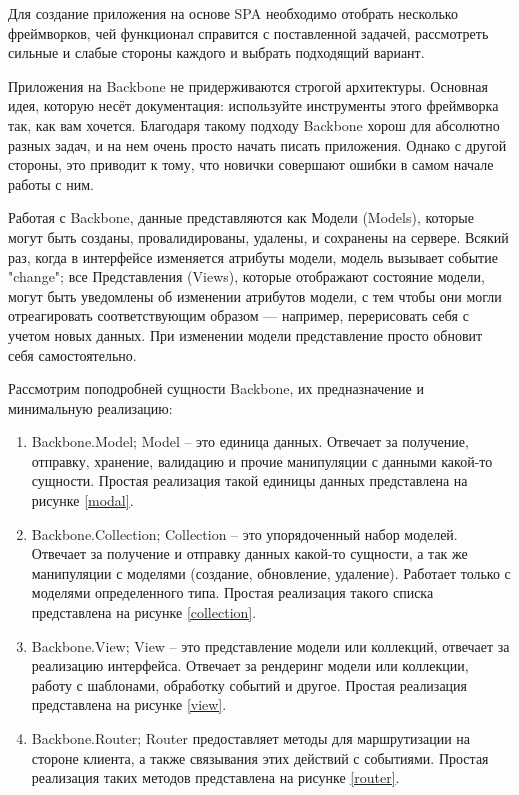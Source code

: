 Для создание приложения на основе SPA необходимо отобрать несколько фреймворков, чей функционал справится с поставленной задачей, рассмотреть сильные и слабые стороны каждого и выбрать подходящий вариант.



Приложения на Backbone не придерживаются строгой архитектуры. Основная идея, которую несёт документация: используйте инструменты этого фреймворка так, как вам хочется. Благодаря такому подходу Backbone хорош для абсолютно разных задач, и на нем очень просто начать писать приложения. Однако с другой стороны, это приводит к тому, что новички совершают ошибки в самом начале работы с ним. 

Работая с Backbone, данные представляются как Модели (Models), которые могут быть созданы, провалидированы, удалены, и сохранены на сервере. Всякий раз, когда в интерфейсе изменяется атрибуты модели, модель вызывает событие "change"; все Представления (Views), которые отображают состояние модели, могут быть уведомлены об изменении атрибутов модели, с тем чтобы они могли отреагировать соответствующим образом — например, перерисовать себя с учетом новых данных. При изменении модели представление просто обновит себя самостоятельно.

Рассмотрим поподробней сущности Backbone, их предназначение и минимальную реализацию:
\begin{enumerate}
\item Backbone.Model; Model  -- это единица данных. Отвечает за получение, отправку, хранение, валидацию и прочие манипуляции с данными какой-то сущности. Простая реализация такой единицы данных представлена на рисунке \ref{modal}.

\item Backbone.Collection; Collection -- это упорядоченный набор  моделей. Отвечает за получение и отправку данных какой-то сущности, а так же манипуляции с моделями (создание, обновление, удаление). Работает только с моделями определенного типа. Простая реализация такого списка представлена на рисунке \ref{collection}.

\item Backbone.View; View -- это представление модели или коллекций, отвечает за реализацию интерфейса. Отвечает за рендеринг модели или коллекции, работу с шаблонами, обработку событий и другое. Простая реализация представлена на рисунке \ref{view}.

\item Backbone.Router; Router предоставляет методы для маршрутизации на стороне клиента, а также связывания этих действий с событиями. Простая реализация таких методов представлена на рисунке \ref{router}.

\end{enumerate}


